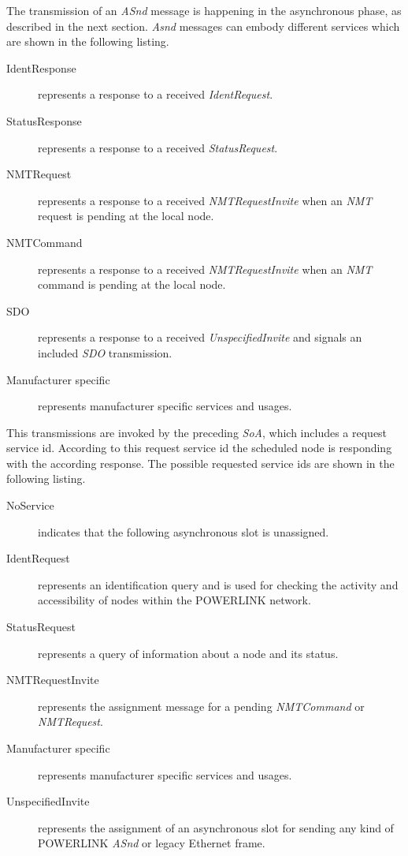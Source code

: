 The transmission of an \emph{ASnd} message is happening in the asynchronous phase, as described in the next section.
\emph{Asnd} messages can embody different services which are shown in the following listing.\cite[section 4.6.1.1.6.1]{epsg_epsg_2013}

\begin{description}
    \item[IdentResponse] represents a response to a received \emph{IdentRequest}.
    \item[StatusResponse] represents a response to a received \emph{StatusRequest}.
    \item[NMTRequest] represents a response to a received \emph{NMTRequestInvite} when an \emph{NMT} request is pending at the local node.
    \item[NMTCommand] represents a response to a received \emph{NMTRequestInvite} when an \emph{NMT} command is pending at the local node.
    \item[SDO] represents a response to a received \emph{UnspecifiedInvite} and signals an included \emph{SDO} transmission.
    \item[Manufacturer specific] represents manufacturer specific services and usages.
\end{description}

This transmissions are invoked by the preceding \emph{SoA}, which includes a request service id.
According to this request service id the scheduled node is responding with the according response.
The possible requested service ids are shown in the following listing. \cite[section 4.6.1.1.5.1]{epsg_epsg_2013}

\begin{description}
    \item[NoService] indicates that the following asynchronous slot is unassigned.
    \item[IdentRequest] represents an identification query and is used for checking the activity and accessibility of nodes within the POWERLINK network.
    \item[StatusRequest] represents a query of information about a node and its status.
    \item[NMTRequestInvite] represents the assignment message for a pending \emph{NMTCommand} or \emph{NMTRequest}.
    \item[Manufacturer specific] represents manufacturer specific services and usages.
    \item[UnspecifiedInvite] represents the assignment of an asynchronous slot for sending any kind of POWERLINK \emph{ASnd} or legacy Ethernet frame.
\end{description}

